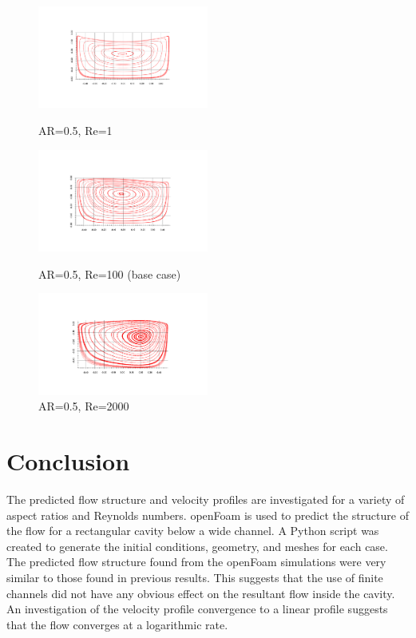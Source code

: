 \documentclass[twocolumn,10pt]{asme2ej}
\begin{document}
\begin{figure}[tbh]
\begin{center}
\includegraphics[width=0.5\textwidth]{figure/AR0.5-Re1 streamFunction axis final.pdf}
\caption{AR=0.5, Re=1}
\label{AR0.5RE1}

\includegraphics[width=0.5\textwidth]{figure/AR0.5-Re100 streamFunction axis final.pdf}
\caption{AR=0.5, Re=100 (base case)}
\label{AR0.5RE100}

\includegraphics[width=0.5\textwidth]{figure/AR0.5-Re2000 streamFunction axis final.pdf}
\caption{AR=0.5, Re=2000}
\label{AR0.5RE2000}
\end{center}
\end{figure}

\section{Conclusion}

The predicted flow structure and velocity profiles are investigated for a variety of aspect ratios and Reynolds numbers. openFoam is used to predict the structure of the flow for a rectangular cavity below a wide channel. A Python script was created to generate the initial conditions, geometry, and meshes for each case. The predicted flow structure found from the openFoam simulations were very similar to those found in previous results. This suggests that the use of finite channels did not have any obvious effect on the resultant flow inside the cavity. An investigation of the velocity profile convergence to a linear profile suggests that the flow converges at a logarithmic rate.
\end{document}
